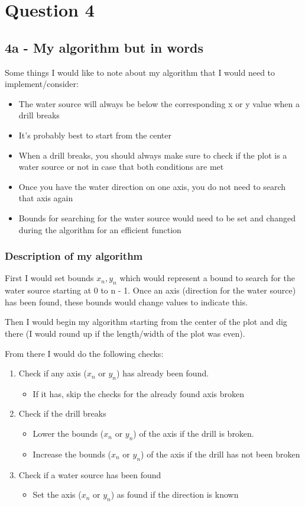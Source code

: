 \documentclass[oneside, a4paper]{article}
\begin{document}
\newpage
\setcounter{secnumdepth}{-1}
\section{Question 4}
\subsection{4a - My algorithm but in words}
Some things I would like to note about my algorithm that I would need to implement/consider:
\begin{itemize}
    \item The water source will always be below the corresponding x or y value when a drill breaks 
    \item It's probably best to start from the center
    \item When a drill breaks, you should always make sure to check if the plot is a water source or not in case that both conditions are met
    \item Once you have the water direction on one axis, you do not need to search that axis again
    \item Bounds for searching for the water source would need to be set and changed during the algorithm for an efficient function
\end{itemize}

\subsubsection{Description of my algorithm}
First I would set bounds $x_n, y_n$ which would represent a bound to search for the water source starting at 0 to n - 1. Once an axis (direction for the water source) has been found, these bounds would change values to indicate this.

Then I would begin my algorithm starting from the center of the plot and dig there (I would round up if the length/width of the plot was even). 

From there I would do the following checks:
\begin{enumerate}
    \item Check if any axis ($x_n$ or $y_n$) has already been found. 
    \begin{itemize}
        \item If it has, skip the checks for the already found axis broken
    \end{itemize}
    \item Check if the drill breaks
        \begin{itemize}
            \item Lower the bounds ($x_n$ or $y_n$) of the axis if the drill is broken. 
            \item Increase the bounds ($x_n$ or $y_n$) of the axis if the drill has not been broken
        \end{itemize}
    \item Check if a water source has been found
    \begin{itemize}
        \item Set the axis ($x_n$ or $y_n$) as found if the direction is known
    \end{itemize}
\end{enumerate}
\end{document}
